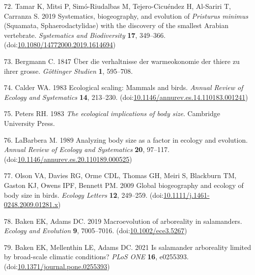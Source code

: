 \documentclass[
  11pt,
]{article}
\begin{document}
\leavevmode\hypertarget{ref-Tamar2019}{}%
72. Tamar K, Mitsi P, Simó-Riudalbas M, Tejero-Cicuéndez H, Al-Sariri T,
Carranza S. 2019 Systematics, biogeography, and evolution of
\emph{Pristurus minimus} (Squamata, Sphaerodactylidae) with the
discovery of the smallest Arabian vertebrate. \emph{Systematics and
Biodiversity} \textbf{17}, 349--366.
(doi:\href{https://doi.org/10.1080/14772000.2019.1614694}{10.1080/14772000.2019.1614694})

\leavevmode\hypertarget{ref-Bergmann1847}{}%
73. Bergmann C. 1847 Über die verhaltnisse der warmeokonomie der thiere
zu ihrer grosse. \emph{Göttinger Studien} \textbf{1}, 595--708.

\leavevmode\hypertarget{ref-Calder1983}{}%
74. Calder WA. 1983 Ecological scaling: Mammals and birds. \emph{Annual
Review of Ecology and Systematics} \textbf{14}, 213--230.
(doi:\href{https://doi.org/10.1146/annurev.es.14.110183.001241}{10.1146/annurev.es.14.110183.001241})

\leavevmode\hypertarget{ref-Peters1983}{}%
75. Peters RH. 1983 \emph{The ecological implications of body size}.
Cambridge University Press.

\leavevmode\hypertarget{ref-LaBarbera1989}{}%
76. LaBarbera M. 1989 Analyzing body size as a factor in ecology and
evolution. \emph{Annual Review of Ecology and Systematics} \textbf{20},
97--117.
(doi:\href{https://doi.org/10.1146/annurev.es.20.110189.000525}{10.1146/annurev.es.20.110189.000525})

\leavevmode\hypertarget{ref-Olson2009}{}%
77. Olson VA, Davies RG, Orme CDL, Thomas GH, Meiri S, Blackburn TM,
Gaston KJ, Owens IPF, Bennett PM. 2009 Global biogeography and ecology
of body size in birds. \emph{Ecology Letters} \textbf{12}, 249--259.
(doi:\href{https://doi.org/10.1111/j.1461-0248.2009.01281.x}{10.1111/j.1461-0248.2009.01281.x})

\leavevmode\hypertarget{ref-Baken2019}{}%
78. Baken EK, Adams DC. 2019 Macroevolution of arboreality in
salamanders. \emph{Ecology and Evolution} \textbf{9}, 7005--7016.
(doi:\href{https://doi.org/10.1002/ece3.5267}{10.1002/ece3.5267})

\leavevmode\hypertarget{ref-Baken2021a}{}%
79. Baken EK, Mellenthin LE, Adams DC. 2021 Is salamander arboreality
limited by broad-scale climatic conditions? \emph{PLoS ONE} \textbf{16},
e0255393.
(doi:\href{https://doi.org/10.1371/journal.pone.0255393}{10.1371/journal.pone.0255393})

\newpage

\hfill\break
\end{document}
